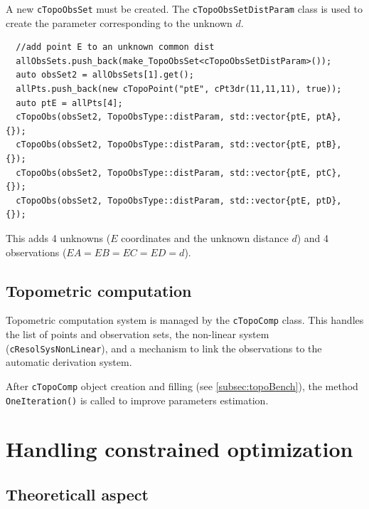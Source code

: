 A new \texttt{cTopoObsSet} must be created. The \texttt{cTopoObsSetDistParam} class
is used to create the parameter corresponding to the unknown $d$.


\begin{lstlisting}
  //add point E to an unknown common dist
  allObsSets.push_back(make_TopoObsSet<cTopoObsSetDistParam>());
  auto obsSet2 = allObsSets[1].get();
  allPts.push_back(new cTopoPoint("ptE", cPt3dr(11,11,11), true));
  auto ptE = allPts[4];
  cTopoObs(obsSet2, TopoObsType::distParam, std::vector{ptE, ptA}, {});
  cTopoObs(obsSet2, TopoObsType::distParam, std::vector{ptE, ptB}, {});
  cTopoObs(obsSet2, TopoObsType::distParam, std::vector{ptE, ptC}, {});
  cTopoObs(obsSet2, TopoObsType::distParam, std::vector{ptE, ptD}, {});
\end{lstlisting}

This adds 4 unknowns ($E$ coordinates and the unknown distance $d$) and 4 observations
($EA = EB = EC = ED = d$).


\subsection{Topometric computation}

Topometric computation system is managed by the \texttt{cTopoComp} class.
This handles the list of points and observation sets, the non-linear system
(\texttt{cResolSysNonLinear}), and a mechanism to link the observations to
the automatic derivation system.

After \texttt{cTopoComp} object creation and filling (see \ref{subsec:topoBench}),
the method \texttt{OneIteration()} is called to improve parameters estimation.


\section{Handling constrained optimization}


\subsection{Theoreticall aspect}


